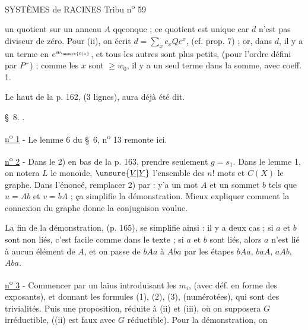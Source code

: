 SYSTÈMES de RACINES \hfill Tribu n\textsuperscript{o} 59

un quotient sur un anneau $A$ qqconque ; ce quotient est unique car $d$ n'est pas diviseur de zéro. Pour (ii), on écrit $d=\sum\limits_x c_x Qe^x$, (cf. prop. 7) ; or, dans $d$, il y a un terme en $e^{w_{\unsure{0|o}}}$, et tous les autres sont plus petits, (pour l'ordre défini par $P^+$) ; comme les $x$ sont $\geq w_0$, il y a un seul terme dans la somme, avec coeff. 1.

Le haut de la p. 162, (3 lignes), aura déjà été dit.

\S~8. .

\uline{n\textsuperscript{o} 1} - Le lemme 6 du \S~6, n\textsuperscript{o} 13 remonte ici.

\uline{n\textsuperscript{o} 2} - Dans le 2) en bas de la p. 163, prendre seulement $g=s_1$. Dans le lemme 1, on notera $L$ le monoïde, $\unsure{\underline V|\underline Y}$ l'ensemble des $n!$ mots et $C(X)$ le graphe. Dans l'énoncé, remplacer 2) par : \textquotedbl{} y'a un mot $A$ et un sommet $b$ tels que $u=Ab$ et $v=bA$ \textquotedbl{} ; ça simplifie la démonstration. Mieux expliquer comment la connexion du graphe donne la conjugaison voulue.

La fin de la démonstration, (p. 165), se simplifie ainsi : il y a deux cas ; si $a$ et $b$ sont non liés, c'est facile comme dans le texte ; si $a$ et $b$ sont liés, alors $a$ n'est lié à aucun élément de $A$, et on passe de $bAa$ à $Aba$ par les étapes $bAa$, $baA$, $aAb$, $Aba$.

\uline{n\textsuperscript{o} 3} - Commencer par un laïus introduisant les $m_i$, (avec déf. en forme des exposants), et donnant les formules (1), (2), (3), (numérotées), qui sont des trivialités. Puis une proposition, réduite à (ii) et (iii), où on supposera $G$ irréductible, ((ii) est faux avec $G$ réductible). Pour la démonstration, on

